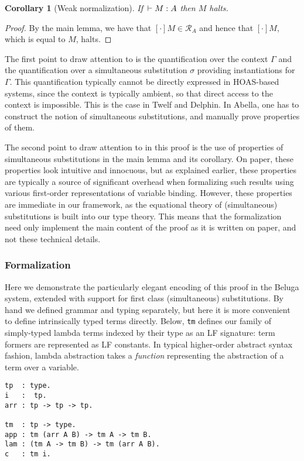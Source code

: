 \documentclass{article}
\newtheorem{corollary}{Corollary}
\begin{document}
\begin{corollary}[Weak normalization]
If $\,\vdash M : A$ then $M$ halts.
\end{corollary}
\begin{proof}
By the main lemma, we have that $[\cdot]M\in \mathcal{R}_A$
and hence that $[\cdot]M$, which is equal to $M$, halts.
\end{proof}

The first point to draw attention to is the quantification
over the context $\Gamma$ and the quantification over a simultaneous
substitution $\sigma$ providing instantiations for $\Gamma$. This
quantification typically cannot be directly expressed in HOAS-based
systems, since the context is typically ambient, so that direct
access to the context is impossible. This is the case in Twelf and
Delphin. In Abella, one has to construct the notion of simultaneous
substitutions, and manually prove properties of them.

The second point to draw attention to in this proof is the use of
properties of simultaneous substitutions in the main
lemma and its corollary. On paper, these properties look intuitive and
innocuous, but as explained earlier, these properties are typically a source of
significant overhead when formalizing such results using various first-order 
representations of variable binding. However, these
properties are immediate in our framework, as
the equational theory of (simultaneous) substitutions is built into
our type theory. This means that the formalization need only implement
the main content of the proof as it is written on paper, and not these
technical details.

\subsubsection{Formalization}\label{sec:belugaweaknorm}

Here we demonstrate the particularly elegant encoding of this proof in
the Beluga system, extended with support for first
class (simultaneous) substitutions. By hand we defined grammar and
typing separately, but here it is more convenient to define
intrinsically typed terms directly. Below, \lstinline{tm} defines our family of simply-typed lambda
terms indexed by their type as an LF signature: term formers are
represented as LF constants. In typical higher-order abstract syntax fashion, lambda
abstraction takes a \emph{function} representing the abstraction of a
term over a variable.

\begin{lstlisting}
tp  : type.               
i   :  tp.
arr : tp -> tp -> tp.

tm  : tp -> type.
app : tm (arr A B) -> tm A -> tm B.
lam : (tm A -> tm B) -> tm (arr A B).
c   : tm i.
\end{lstlisting}
\end{document}
